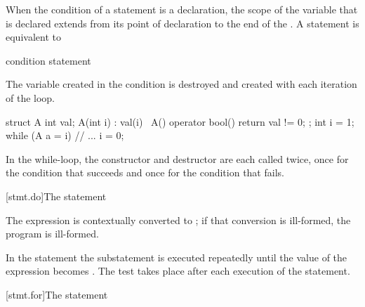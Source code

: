 \pnum
{}%
When the condition of a  statement is a declaration, the scope of
the variable that is declared extends from its point of
declaration to the end of the 
. A  statement is equivalent to
\begin{ncsimplebnf}
 \terminal{:}\br
\terminal{\{}\br
\bnfindent {} \terminal{(} condition \terminal{)} \terminal{\{}\br
\bnfindent \bnfindent statement\br
\bnfindent \bnfindent {}  \terminal{;}\br
\bnfindent \terminal{\}}\br
\terminal{\}}
\end{ncsimplebnf}
\begin{note}
The variable created in the condition is destroyed and created with each
iteration of the loop.
\begin{example}
\begin{codeblock}
struct A {
  int val;
  A(int i) : val(i) { }
  ~A() { }
  operator bool() { return val != 0; }
};
int i = 1;
while (A a = i) {
  // ...
  i = 0;
}
\end{codeblock}
In the while-loop, the constructor and destructor are each called twice,
once for the condition that succeeds and once for the condition that
fails.
\end{example}
\end{note}

[stmt.do]{The  statement}%

\pnum
The expression is contextually converted to ;
if that conversion is ill-formed, the program is ill-formed.

\pnum
In the  statement the substatement is executed repeatedly
until the value of the expression becomes . The test takes
place after each execution of the statement.

[stmt.for]{The  statement}%


